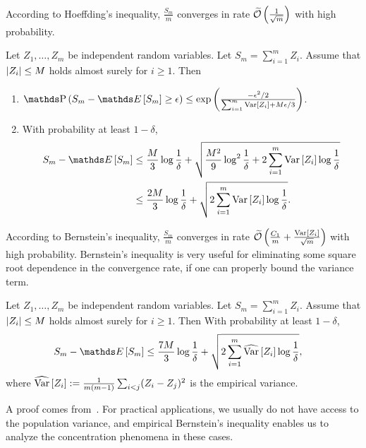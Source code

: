 \documentclass{article}
\begin{document}
\begin{rmk}
According to Hoeffding's inequality, $\frac{S_m}{m}$ converges in rate $\operatorname{\widetilde{\mathcal{O}}}\left(\frac{1}{\sqrt{m}}\right)$ with high probability.
\end{rmk}

\begin{thm}
Let  $Z_1, \dots, Z_m$ be independent random variables.  Let $S_m = \sum_{i=1}^m Z_i$.
Assume that $\left|Z_i\right| \le M $ holds almost surely for $i\ge 1$.
Then
\begin{enumerate}
\item 
$\prob{ S_m - \expect{S_m} \ge \epsilon } \le \exp \left( \frac{-\epsilon^2 / 2}{\sum_{i=1}^m \var{Z_i} + M \epsilon / 3} \right)$.
\item With probability at least $1-\delta$,
\begin{align*}
S_m - \expect{S_m} 
& \le \frac{M}{3}\log\frac{1}{\delta} + \sqrt{\frac{M^2}{9}\log^2\frac{1}{\delta} + 2\sum_{i=1}^m\var{Z_i} \log\frac{1}{\delta}} \\
& \le \frac{2M}{3}\log\frac{1}{\delta} + \sqrt{2\sum_{i=1}^m\var{Z_i} \log\frac{1}{\delta}}.
\end{align*}
\end{enumerate}
\end{thm}

\begin{rmk}
According to Bernstein's inequality, $\frac{S_m}{m}$ converges in rate $\bigOT{\frac{C_1}{m} + \frac{\var{Z_i}}{\sqrt{m}} }$ with high probability.
Bernstein's inequality is very useful for eliminating some square root dependence in the convergence rate, if one can properly bound the variance term.
\end{rmk}

\begin{thm}
Let  $Z_1, \dots, Z_m$ be independent random variables.  Let $S_m = \sum_{i=1}^m Z_i$.
Assume that $\left|Z_i\right| \le M $ holds almost surely for $i\ge 1$.
Then
With probability at least $1-\delta$,
\begin{align*}
S_m - \expect{S_m} 
& \le \frac{7M}{3}\log\frac{1}{\delta} + \sqrt{2\sum_{i=1}^m\widehat{\Var}\sbracket{Z_i} \log\frac{1}{\delta}},
\end{align*}
where $\widehat{\operatorname{Var}}\left[Z_i\right]:=\frac{1}{m(m-1)}\sum_{i<j}(Z_i-Z_j)^2$ is the empirical variance.
\end{thm}
\begin{rmk}
A proof comes from~\cite{maurer2009empirical}.
For practical applications, we usually do not have access to the population variance, and empirical Bernstein's inequality enables us to analyze the concentration phenomena in these cases.
\end{rmk}
\end{document}
